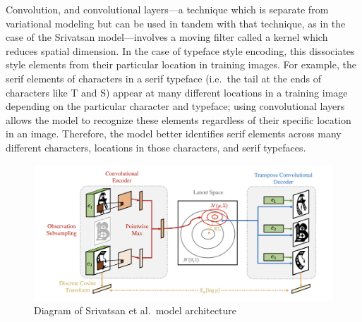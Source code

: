 Convolution, and convolutional layers---a technique which is separate from variational modeling but can be used in tandem with that technique, as in the case of the Srivatsan model---involves a moving filter called a kernel which reduces spatial dimension. In the case of typeface style encoding, this dissociates style elements from their particular location in training images. For example, the serif elements of characters in a serif typeface (i.e.\ the tail at the ends of characters like T and S) appear at many different locations in a training image depending on the particular character and typeface; using convolutional layers allows the model to recognize these elements regardless of their specific location in an image. Therefore, the model better identifies serif elements across many different characters, locations in those characters, and serif typefaces.

\begin{figure}[]
    \centering
    \includegraphics[width=\textwidth]{images/srivatsan-model.png}
    \caption{Diagram of Srivatsan et al.\ model architecture \cite{srivatsan2020}}
    \label{fig:srivatsan-model-2}
\end{figure}

